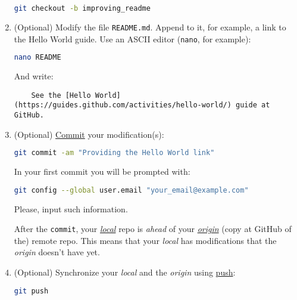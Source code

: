 \begin{enumerate}
  \begin{lstlisting}[language=bash]
    git checkout -b improving_readme
  \end{lstlisting}
  
\item (Optional) Modify the file \texttt{README.md}. Append to it, for
  example, a link to the Hello World guide. Use an ASCII editor
  (\texttt{nano}, for example):

  \begin{lstlisting}[language=bash]
    nano README
  \end{lstlisting}

  And write:
  
  \begin{lstlisting}
    See the [Hello World](https://guides.github.com/activities/hello-world/) guide at GitHub.
  \end{lstlisting}
  
\item (Optional)
  \href{https://docs.github.com/en/github/getting-started-with-github/github-glossary#commit}{Commit}
  your modification(s):

  \begin{lstlisting}[language=bash, showstringspaces=false, upquote=true]
    git commit -am "Providing the Hello World link"
  \end{lstlisting}

  In your first commit you will be prompted with:

  \begin{lstlisting}[language=bash]
    git config --global user.email "your_email@example.com"
  \end{lstlisting}

  Please, input such information.
  
  After the \texttt{commit}, your \href{https://docs.github.com/en/github/getting-started-with-github/github-glossary#fetch}{\emph{local}} repo is \emph{ahead} of
  your
  \href{https://docs.github.com/en/github/getting-started-with-github/github-glossary#origin}{\emph{origin}}
  (copy at GitHub of the) remote repo. This means that your
  \emph{local} has modifications that the \emph{origin} doesn't have yet.

\item (Optional) Synchronize your \emph{local} and the \emph{origin}
  using
  \href{https://docs.github.com/en/github/getting-started-with-github/github-glossary#push}{push}:

  \begin{lstlisting}[language=bash]
    git push
  \end{lstlisting}


\end{enumerate}
